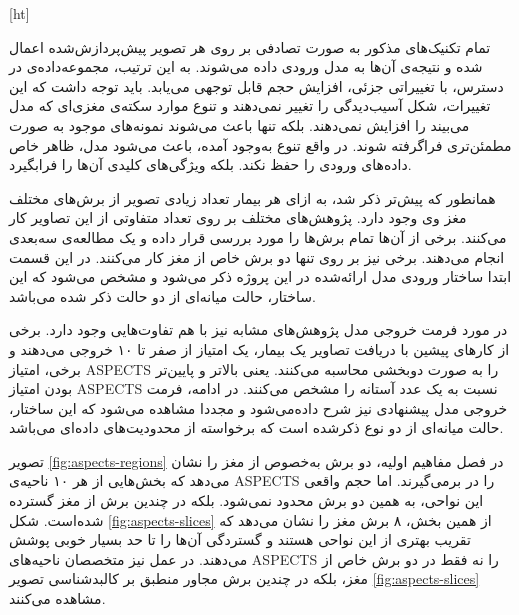 
[ht]

تمام تکنیک‌های مذکور به صورت تصادفی بر روی هر تصویر پیش‌پردازش‌شده اعمال شده و نتیجه‌ی آن‌ها
به مدل ورودی داده می‌شوند.
به این ترتیب، مجموعه‌داده‌ی در دسترس، با تغییراتی جزئی، افزایش حجم قابل توجهی می‌یابد.
باید توجه داشت که این تغییرات، شکل آسیب‌دیدگی را تغییر نمی‌دهند و تنوع موارد سکته‌ی مغزی‌ای که مدل می‌بیند را 
افزایش نمی‌دهند.
بلکه تنها باعث می‌شوند نمونه‌های موجود به صورت مطمئن‌تری فراگرفته شوند.
در واقع تنوع به‌وجود آمده، باعث می‌شود مدل، ظاهر خاص داده‌های ورودی را حفظ نکند. بلکه ویژگی‌های کلیدی آن‌ها را فرابگیرد.


همانطور که پیش‌تر ذکر شد، به ازای هر بیمار تعداد زیادی تصویر از برش‌های مختلف مغز وی وجود دارد.
پژوهش‌ها‌ی مختلف بر روی تعداد متفاوتی از این تصاویر کار می‌کنند.
برخی از آن‌ها تمام برش‌ها را مورد بررسی قرار داده و یک مطالعه‌ی سه‌بعدی انجام می‌دهند.
برخی نیز بر روی تنها دو برش خاص از مغز کار می‌کنند.
در این قسمت ابتدا ساختار ورودی مدل ارائه‌شده در این پروژه ذکر می‌شود
و مشخص می‌شود که
این ساختار، حالت میانه‌ای از دو حالت ذکر شده می‌باشد.

در مورد فرمت خروجی مدل پژوهش‌های مشابه نیز با هم تفاوت‌هایی وجود دارد.
برخی از کارهای پیشین با دریافت تصاویر یک بیمار، یک امتیاز از صفر تا ۱۰ خروجی می‌دهند و برخی، امتیاز ASPECTS را به صورت دوبخشی محاسبه می‌کنند.
یعنی بالاتر و پایین‌تر بودن امتیاز ASPECTS نسبت به یک عدد آستانه را مشخص می‌کنند.
در ادامه، فرمت خروجی مدل پیشنهادی نیز شرح داده‌می‌شود و
مجددا مشاهده می‌شود که این ساختار، حالت میانه‌ای از دو نوع ذکرشده است که برخواسته از محدودیت‌های داده‌ای می‌باشد.


تصویر \ref{fig:aspects-regions}
در فصل مفاهیم اولیه، دو برش به‌خصوص از مغز را نشان می‌دهد که بخش‌هایی از هر ۱۰ ناحیه‌ی ASPECTS را در برمی‌گیرند.
اما حجم واقعی این نواحی، به همین دو برش محدود نمی‌شود.
بلکه در چندین برش از مغز گسترده شده‌است.
شکل \ref{fig:aspects-slices}
از همین بخش، ۸ برش مغز را نشان می‌دهد که تقریب بهتری از این نواحی هستند و گستردگی آن‌ها را تا حد بسیار خوبی پوشش می‌دهند.
در عمل نیز متخصصان
ناحیه‌های ASPECTS را 
 نه فقط در دو برش خاص از مغز، بلکه 
 در چندین برش مجاور منطبق بر کالبدشناسی تصویر 
 \ref{fig:aspects-slices}
 مشاهده می‌کنند.

